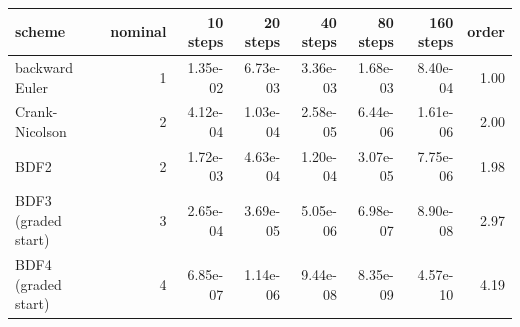 \begin{tabular}{lrrrrrrr}
\hline
scheme & nominal & 10 steps & 20 steps & 40 steps & 80 steps & 160 steps & order\\
\hline
backward Euler & 1 & 1.35e-02 & 6.73e-03 & 3.36e-03 & 1.68e-03 & 8.40e-04 & 1.00\\
Crank-Nicolson & 2 & 4.12e-04 & 1.03e-04 & 2.58e-05 & 6.44e-06 & 1.61e-06 & 2.00\\
BDF2 & 2 & 1.72e-03 & 4.63e-04 & 1.20e-04 & 3.07e-05 & 7.75e-06 & 1.98\\
BDF3 (graded start) & 3 & 2.65e-04 & 3.69e-05 & 5.05e-06 & 6.98e-07 & 8.90e-08 & 2.97\\
BDF4 (graded start) & 4 & 6.85e-07 & 1.14e-06 & 9.44e-08 & 8.35e-09 & 4.57e-10 & 4.19\\
\hline
\end{tabular}
